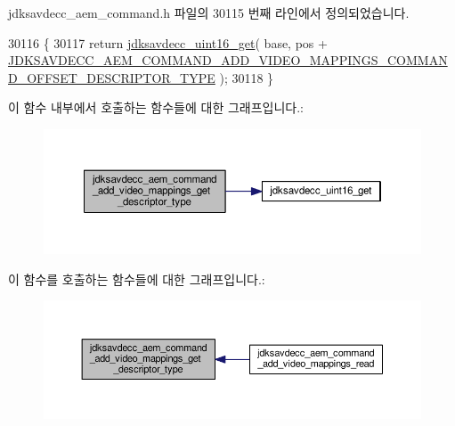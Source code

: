 jdksavdecc\+\_\+aem\+\_\+command.\+h 파일의 30115 번째 라인에서 정의되었습니다.


\begin{DoxyCode}
30116 \{
30117     \textcolor{keywordflow}{return} \hyperlink{group__endian_ga3fbbbc20be954aa61e039872965b0dc9}{jdksavdecc\_uint16\_get}( base, pos + 
      \hyperlink{group__command__add__video__mappings_ga3127188c563e5d2b980716cb79540903}{JDKSAVDECC\_AEM\_COMMAND\_ADD\_VIDEO\_MAPPINGS\_COMMAND\_OFFSET\_DESCRIPTOR\_TYPE}
       );
30118 \}
\end{DoxyCode}


이 함수 내부에서 호출하는 함수들에 대한 그래프입니다.\+:
\nopagebreak
\begin{figure}[H]
\begin{center}
\leavevmode
\includegraphics[width=350pt]{group__command__add__video__mappings_gabf6d1cf71ceb3a3fb8b9dc6aeb217dc5_cgraph}
\end{center}
\end{figure}




이 함수를 호출하는 함수들에 대한 그래프입니다.\+:
\nopagebreak
\begin{figure}[H]
\begin{center}
\leavevmode
\includegraphics[width=350pt]{group__command__add__video__mappings_gabf6d1cf71ceb3a3fb8b9dc6aeb217dc5_icgraph}
\end{center}
\end{figure}


